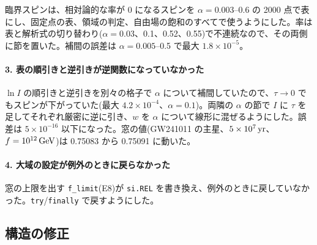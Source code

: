 臨界スピンは、相対論的な率が 0 になるスピンを $\alpha=0.003$--0.6 の 2000 点で表にし、固定点の表、領域の判定、自由場の飽和のすべてで使うようにした。率は表と解析式の切り替わり($\alpha=0.03$、0.1、0.52、0.55)で不連続なので、その両側に節を置いた。補間の誤差は $\alpha=0.005$--0.5 で最大 $1.8\times10^{-5}$。

\paragraph{3. 表の順引きと逆引きが逆関数になっていなかった}
$\ln I$ の順引きと逆引きを別々の格子で $\alpha$ について補間していたので、$\tau\to0$ でもスピンが下がっていた(最大 $4.2\times10^{-4}$、$\alpha=0.1$)。両隣の $\alpha$ の節で $I$ に $\tau$ を足してそれぞれ厳密に逆に引き、$w$ を $\alpha$ について線形に混ぜるようにした。誤差は $5\times10^{-16}$ 以下になった。窓の値(GW241011 の主星、$5\times10^7\,\mathrm{yr}$、$f=10^{12}\,\mathrm{GeV}$)は 0.75083 から 0.75091 に動いた。

\paragraph{4. 大域の設定が例外のときに戻らなかった}
窓の上限を出す \texttt{f\_limit}(E8)が \texttt{si.REL} を書き換え、例外のときに戻していなかった。\texttt{try}/\texttt{finally} で戻すようにした。

\subsection{構造の修正}

